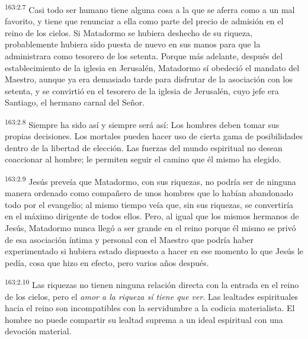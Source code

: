 \par 
\textsuperscript{163:2.7} Casi todo ser humano tiene alguna cosa a la que se aferra como a un mal favorito, y tiene que renunciar a ella como parte del precio de admisión en el reino de los cielos. Si Matadormo se hubiera deshecho de su riqueza, probablemente hubiera sido puesta de nuevo en sus manos para que la administrara como tesorero de los setenta. Porque más adelante, después del establecimiento de la iglesia en Jerusalén, Matadormo sí obedeció el mandato del Maestro, aunque ya era demasiado tarde para disfrutar de la asociación con los setenta, y se convirtió en el tesorero de la iglesia de Jerusalén, cuyo jefe era Santiago, el hermano carnal del Señor.

\par 
\textsuperscript{163:2.8} Siempre ha sido así y siempre será así: Los hombres deben tomar sus propias decisiones. Los mortales pueden hacer uso de cierta gama de posibilidades dentro de la libertad de elección. Las fuerzas del mundo espiritual no desean coaccionar al hombre; le permiten seguir el camino que él mismo ha elegido.

\par 
\textsuperscript{163:2.9} Jesús preveía que Matadormo, con sus riquezas, no podría ser de ninguna manera ordenado como compañero de unos hombres que lo habían abandonado todo por el evangelio; al mismo tiempo veía que, sin sus riquezas, se convertiría en el máximo dirigente de todos ellos. Pero, al igual que los mismos hermanos de Jesús, Matadormo nunca llegó a ser grande en el reino porque él mismo se privó de esa asociación íntima y personal con el Maestro que podría haber experimentado si hubiera estado dispuesto a hacer en ese momento lo que Jesús le pedía, cosa que hizo en efecto, pero varios años después.

\par 
\textsuperscript{163:2.10} Las riquezas no tienen ninguna relación directa con la entrada en el reino de los cielos, pero el \textit{amor a la riqueza sí tiene que ver}. Las lealtades espirituales hacia el reino son incompatibles con la servidumbre a la codicia materialista. El hombre no puede compartir su lealtad suprema a un ideal espiritual con una devoción material.


